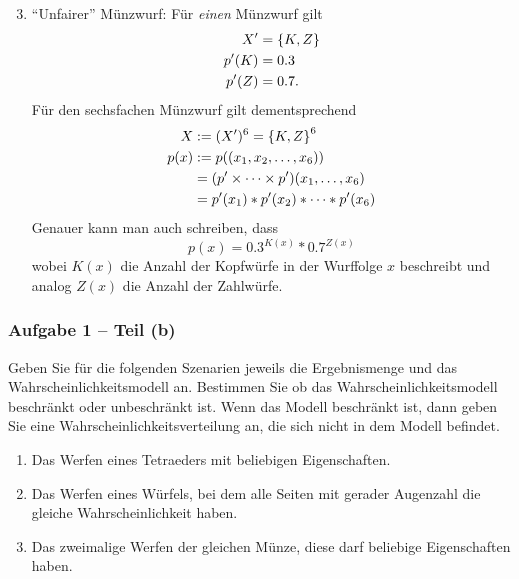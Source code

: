 \documentclass{beamer}
\begin{document}
\begin{frame}
	\footnotesize
	\begin{enumerate}[1.]
		\setcounter{enumi}{2}
		\item \enquote{Unfairer} Münzwurf: Für \textit{einen} Münzwurf gilt
		\begin{align*}
			X' &= \left\{ K, Z \right\} \\
			p'(K) &= 0.3 \\
			p'(Z) &= 0.7.
		\end{align*}
		Für den sechsfachen Münzwurf gilt dementsprechend
		\begin{align*}
			X &\mathrel{:=} (X')^6 = \left\{ K, Z \right\}^6 \\
			p(x) &\mathrel{:=} p((x_1, x_2, \dots, x_6)) \\
			&= (p' \times \dots \times p')(x_1, \dots, x_6) \\
			&= p'(x_1) * p'(x_2) * \dots * p'(x_6)
		\end{align*}
		Genauer kann man auch schreiben, dass 
		\begin{equation*}
			p(x) = 0.3^{K(x)} * 0.7^{Z(x)}
		\end{equation*}
		wobei $K(x)$ die Anzahl der Kopfwürfe in der Wurffolge $x$ beschreibt und analog $Z(x)$ die Anzahl der Zahlwürfe.
	\end{enumerate}
\end{frame}

\begin{frame} \frametitle{Aufgabe 1 -- Teil (b)}
	\justifying\small
	Geben Sie für die folgenden Szenarien jeweils die Ergebnismenge und das Wahrscheinlichkeitsmodell an. Bestimmen Sie ob das Wahrscheinlichkeitsmodell beschränkt oder unbeschränkt ist. Wenn das Modell beschränkt ist, dann geben Sie eine Wahrscheinlichkeitsverteilung an, die sich nicht in dem Modell befindet.
	\begin{enumerate}[1.]
		\item Das Werfen eines Tetraeders mit beliebigen Eigenschaften.
		\item Das Werfen eines Würfels, bei dem alle Seiten mit gerader Augenzahl die gleiche
		Wahrscheinlichkeit haben.
		\item Das zweimalige Werfen der gleichen Münze, diese darf beliebige Eigenschaften haben.
	\end{enumerate}
\end{frame}
\end{document}
